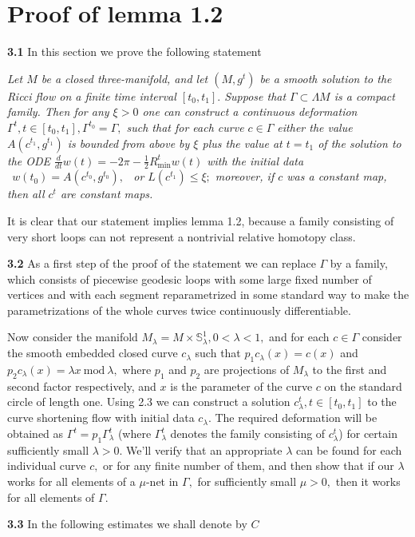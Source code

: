 \documentclass{article}
\newcommand{\la}{\lambda}
\newcommand{\G}{\Gamma}
\begin{document}
\section{Proof of lemma 1.2}
\par  {\bf 3.1} In this section we prove the following statement
\par {\it Let $M$ be a closed three-manifold, and let $(M,g^t)$ be a
smooth solution to the Ricci flow on a finite time interval
$[t_0,t_1].$ Suppose that $\G\subset \Lambda M$ is a compact
family. Then for any $\xi>0$ one can construct a continuous
deformation $\G^t, t\in [t_0,t_1], \G^{t_0}=\G,$ such that for
each curve $c\in\G$  either the value $A(c^{t_1},g^{t_1})$ is
bounded from above by $\xi$ plus the value at $t=t_1$ of the
solution to the ODE
$\frac{d}{dt}w(t)=-2\pi-\frac{1}{2}R^t_{\mathrm{min}}w(t)$ with
the initial data $\ \ w(t_0)=A(c^{t_0},g^{t_0}),\ \ $ or
$L(c^{t_1})\le \xi;$ moreover, if $c$ was a constant map, then all
$c^t$ are constant maps.}
\par It is clear that our statement implies lemma 1.2, because a
family consisting of very short loops can not represent a
nontrivial relative homotopy class.
\par {\bf 3.2} As a first step of the proof of the statement we
can  replace $\G$ by a family, which consists of piecewise
geodesic loops with some large fixed number of vertices and with
each segment reparametrized in some standard way to make the
parametrizations of the whole curves twice continuously
differentiable.
\par Now consider the manifold $M_{\la}=M\times\mathbb{S}^1_{\la},
0<\la<1,$ and for each $c\in\G$ consider the smooth embedded
closed curve $c_{\la}$ such that $p_1c_{\la}(x)=c(x)$ and
$p_2c_{\la}(x)=\la x\  \mathrm{mod}\  \la,$ where $p_1$ and $p_2$
are projections of $M_{\la}$ to the first and second factor
respectively, and $x$ is the parameter of the curve $c$ on the
standard circle of length one. Using 2.3 we can construct a
solution $c_{\la}^t, t\in [t_0,t_1]$ to the curve shortening flow
with initial data $c_{\la}.$ The required deformation will be
obtained as $\G^t=p_1\G^t_{\la}$ (where $\G^t_{\la}$ denotes the
family consisting of $c^t_{\la}$) for certain sufficiently small
$\la>0.$ We'll verify that an appropriate $\la$ can be found for
each individual curve $c,$ or for any finite number of them, and
then show that if our $\la$ works for all elements of a $\mu$-net
in $\G,$ for sufficiently small $\mu>0,$ then it works for all
elements of $\G.$
\par {\bf 3.3} In the following estimates we shall denote by $C$
\end{document}

